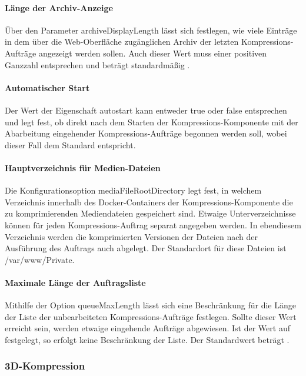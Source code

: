 \paragraph{Länge der Archiv-Anzeige} Über den Parameter {\ttfamily archive\-Display\-Leng\-th} lässt sich festlegen, wie viele Einträge in dem über die Web-Oberfläche zugänglichen Archiv der letzten Kompressions-Aufträge angezeigt werden sollen. Auch dieser Wert muss einer positiven Ganzzahl entsprechen und beträgt standardmäßig {}.

\paragraph{Automatischer Start} Der Wert der Eigenschaft {\ttfamily autostart} kann entweder {\ttfamily true} oder {\ttfamily false} entsprechen und legt fest, ob direkt nach dem Starten der Kompressions-Komponente mit der Abarbeitung eingehender Kompressions-Aufträge begonnen werden soll, wobei dieser Fall dem Standard entspricht.

\paragraph{Hauptverzeichnis für Medien-Dateien} Die Konfigurationsoption {\ttfamily media\-File\-Root\-Directory} legt fest, in welchem Verzeichnis innerhalb des Docker-Containers der Kompressions-Komponente die zu komprimierenden Mediendateien gespeichert sind. Etwaige Unterverzeichnisse können für jeden Kompressions-Auftrag separat angegeben werden. In ebendiesem Verzeichnis werden die komprimierten Versionen der Dateien nach der Ausführung des Auftrags auch abgelegt. Der Standardort für diese Dateien ist {\ttfamily /var/www/Private}.

\paragraph{Maximale Länge der Auftragsliste} Mithilfe der Option {\ttfamily queueMaxLength} lässt sich eine Beschränkung für die Länge der Liste der unbearbeiteten Kompressions-Aufträge festlegen. Sollte dieser Wert erreicht sein, werden etwaige eingehende Aufträge abgewiesen. Ist der Wert auf {} festgelegt, so erfolgt keine Beschränkung der Liste. Der Standardwert beträgt {}.


\subsubsection{3D-Kompression}

